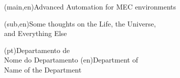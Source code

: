 
%




\nttitle(main,en){Advanced Automation for MEC environments}%

\nttitle(sub,en){Some thoughts on the Life, the Universe,\\and Everything Else}%




\ntdepartment*(pt){Departamento de\\Nome do Departamento}
\ntdepartment*(en){Department of\\Name of the Department}



